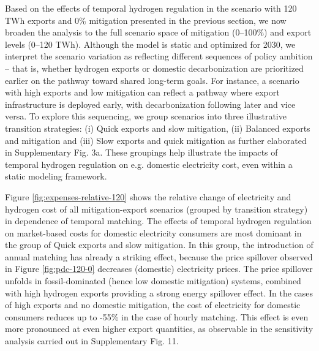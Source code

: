 
Based on the effects of temporal hydrogen regulation in the scenario with 120 TWh exports and 0\% \co mitigation presented in the previous section, we now broaden the analysis to the full scenario space of mitigation (0–100\%) and export levels (0–120 TWh).
Although the model is static and optimized for 2030, we interpret the scenario variation as reflecting different sequences of policy ambition -- that is, whether hydrogen exports or domestic decarbonization are prioritized earlier on the pathway toward shared long-term goals. For instance, a scenario with high exports and low \co mitigation can reflect a pathway where export infrastructure is deployed early, with decarbonization following later and vice versa.
To explore this sequencing, we group scenarios into three illustrative transition strategies: 
(i) Quick exports and slow \co mitigation,
(ii) Balanced exports and \co mitigation and
(iii) Slow exports and quick \co mitigation as further elaborated in Supplementary Fig. 3a. %
These groupings help illustrate the impacts of temporal hydrogen regulation on e.g. domestic electricity cost, even within a static modeling framework.

Figure \ref{fig:expenses-relative-120} shows the relative change of electricity and hydrogen cost of all mitigation-export scenarios (grouped by transition strategy) in dependence of temporal matching. 
The effects of temporal hydrogen regulation on market-based costs for domestic electricity consumers are most dominant in the group of Quick exports and slow \co mitigation.
In this group, the introduction of annual matching has already a striking effect, because the price spillover observed in Figure \ref{fig:pdc-120-0} decreases (domestic) electricity prices. The price spillover unfolds in fossil-dominated (hence low domestic \co mitigation) systems, combined with high hydrogen exports providing a strong energy spillover effect. In the cases of high exports and no domestic \co mitigation, the cost of electricity for domestic consumers reduces up to -55\% in the case of hourly matching.
This effect is even more pronounced at even higher export quantities, as observable in the sensitivity analysis carried out in Supplementary Fig. 11. %


